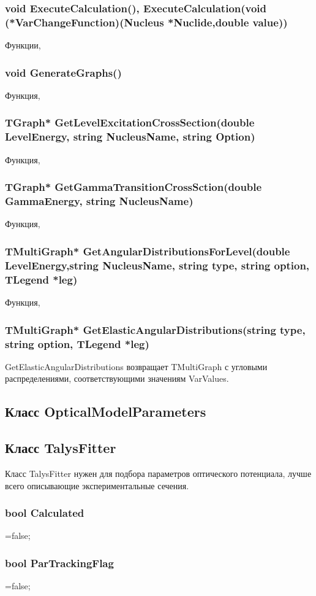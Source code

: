 \documentclass[a4paper,12pt]{extarticle}
\begin{document}
\subsubsection{void ExecuteCalculation(), ExecuteCalculation(void (*VarChangeFunction)(Nucleus *Nuclide,double value))}
Функции, 
\subsubsection{void GenerateGraphs()}
Функция, 
\subsubsection{TGraph* GetLevelExcitationCrossSection(double LevelEnergy, string NucleusName, string Option)}
Функция, 
\subsubsection{TGraph* GetGammaTransitionCrossSction(double GammaEnergy, string NucleusName)}
Функция, 
\subsubsection{TMultiGraph* GetAngularDistributionsForLevel(double LevelEnergy,string NucleusName, string type, string option, TLegend *leg)}
Функция, 
\subsubsection{TMultiGraph* GetElasticAngularDistributions(string type, string option, TLegend *leg)}
GetElasticAngularDistributions возвращает TMultiGraph с угловыми распределениями, соответствующими значениям VarValues.

\subsection{Класс OpticalModelParameters}

\subsection{Класс TalysFitter}
Класс TalysFitter нужен для подбора параметров оптического потенциала, лучше всего описывающие экспериментальные сечения. 
\subsubsection{bool Calculated}
=false;
\subsubsection{bool ParTrackingFlag}
=false;
\end{document}
